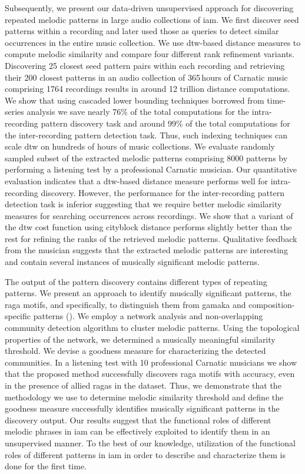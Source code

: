 {Subsequently, we present our data-driven unsupervised approach for discovering repeated melodic patterns in large audio collections of \gls{iam}. We first discover seed patterns within a recording and later used those as queries to detect similar occurrences in the entire music collection. We use \gls{dtw}-based distance measures to compute melodic similarity and compare four different rank refinement variants. Discovering 25 closest seed pattern pairs within each recording and retrieving their 200 closest patterns in an audio collection of 365\,hours of Carnatic music comprising 1764 recordings results in around 12 trillion distance computations. We show that using cascaded lower bounding techniques borrowed from time-series analysis we save nearly 76\% of the total computations for the intra-recording pattern discovery task and around 99\% of the total computations for the inter-recording pattern detection task. Thus, such indexing techniques can scale \gls{dtw} on hundreds of hours of music collections. We evaluate randomly sampled subset of the extracted melodic patterns comprising 8000 patterns by performing a listening test by a professional Carnatic musician. Our quantitative evaluation indicates that a \gls{dtw}-based distance measure performs well for intra-recording discovery. However, the performance for the inter-recording pattern detection task is inferior suggesting that we require better melodic similarity measures for searching occurrences across recordings. We show that a variant of the \gls{dtw} cost function using cityblock distance performs slightly better than the rest for refining the ranks of the retrieved melodic patterns. Qualitative feedback from the musician suggests that the extracted melodic patterns are interesting and contain several instances of musically significant melodic patterns. 

The output of the pattern discovery contains different types of repeating patterns. We present an approach to identify musically significant patterns, the \gls{raga} motifs, and specifically, to distinguish them from \gls{gamaka} and composition-specific patterns ().  We employ a network analysis and non-overlapping community detection algorithm to cluster melodic patterns. Using the topological properties of the network, we determined a musically meaningful similarity threshold. We devise a goodness measure for characterizing the detected communities. In a listening test with 10 professional Carnatic musicians we show that the proposed method successfully discovers \gls{raga} motifs with accuracy, even in the presence of allied \glspl{raga} in the dataset. Thus, we demonstrate that the methodology we use to determine melodic similarity threshold and define the goodness measure successfully identifies musically significant patterns in the discovery output.  Our results suggest that the functional roles of different melodic phrases in \gls{iam} can be effectively exploited to identify them in an unsupervised manner. To the best of our knowledge, utilization of the functional roles of different patterns in \gls{iam} in order to describe and characterize them is done for the first time.

}
